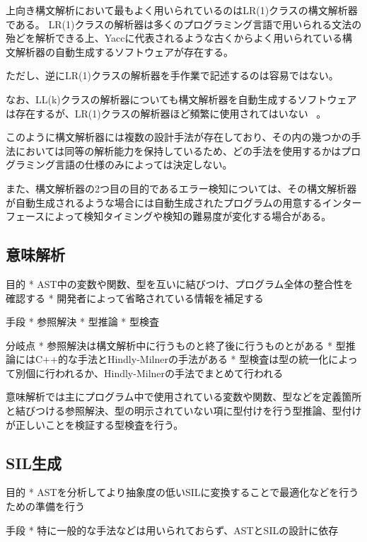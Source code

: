 
上向き構文解析において最もよく用いられているのはLR(1)クラスの構文解析器である。
LR(1)クラスの解析器は多くのプログラミング言語で用いられる文法の殆どを解析できる上、Yaccに代表されるような古くからよく用いられている構文解析器の自動生成するソフトウェアが存在する。

ただし、逆にLR(1)クラスの解析器を手作業で記述するのは容易ではない。

なお、LL(k)クラスの解析器についても構文解析器を自動生成するソフトウェアは存在するが、LR(1)クラスの解析器ほど頻繁に使用されてはいない ~\cite{antlr}。

\vspace{2em}

このように構文解析器には複数の設計手法が存在しており、その内の幾つかの手法においては同等の解析能力を保持しているため、どの手法を使用するかはプログラミング言語の仕様のみによっては決定しない。

また、構文解析器の2つ目の目的であるエラー検知については、その構文解析器が自動生成されるような場合には自動生成されたプログラムの用意するインターフェースによって検知タイミングや検知の難易度が変化する場合がある。

\subsection{意味解析}

目的
* AST中の変数や関数、型を互いに結びつけ、プログラム全体の整合性を確認する
* 開発者によって省略されている情報を補足する

手段
* 参照解決
* 型推論
* 型検査

分岐点
* 参照解決は構文解析中に行うものと終了後に行うものとがある
* 型推論にはC++的な手法とHindly-Milnerの手法がある
* 型検査は型の統一化によって別個に行われるか、Hindly-Milnerの手法でまとめて行われる

意味解析では主にプログラム中で使用されている変数や関数、型などを定義箇所と結びつける参照解決、型の明示されていない項に型付けを行う型推論、型付けが正しいことを検証する型検査を行う。

\subsection{SIL生成}

目的
* ASTを分析してより抽象度の低いSILに変換することで最適化などを行うための準備を行う

手段
* 特に一般的な手法などは用いられておらず、ASTとSILの設計に依存

